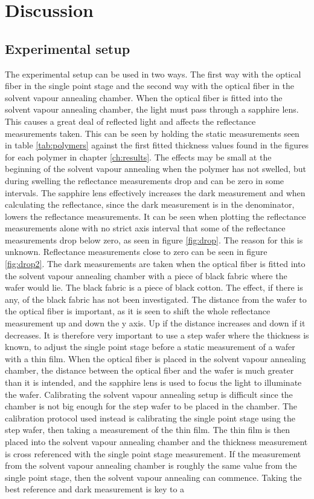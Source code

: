 \documentclass[MasterThesisMain.tex]{subfiles}
\begin{document}
\chapter{Discussion} \label{ch:discussion}

\section{Experimental setup}
The experimental setup can be used in two ways. The first way with the optical fiber in the single point stage and the second way with the optical fiber in the solvent vapour annealing chamber. When the optical fiber is fitted into the solvent vapour annealing chamber, the light must pass through a sapphire lens. This causes a great deal of reflected light and affects the reflectance measurements taken. This can be seen by holding the static measurements seen in table \ref{tab:polymers} against the first fitted thickness values found in the figures for each polymer in chapter \ref{ch:results}. The effects may be small at the beginning of the solvent vapour annealing when the polymer has not swelled, but during swelling the reflectance measurements drop and can be zero in some intervals. The sapphire lens effectively increases the dark measurement and when calculating the reflectance, since the dark measurement is in the denominator, lowers the reflectance measurements. It can be seen when plotting the reflectance measurements alone with no strict axis interval that some of the reflectance measurements drop below zero, as seen in figure \ref{fig:drop}. The reason for this is unknown. Reflectance measurements close to zero can be seen in figure \ref{fig:drop2}. The dark measurements are taken when the optical fiber is fitted into the solvent vapour annealing chamber with a piece of black fabric where the wafer would lie. The black fabric is a piece of black cotton. The effect, if there is any, of the black fabric has not been investigated. The distance from the wafer to the optical fiber is important, as it is seen to shift the whole reflectance measurement up and down the y axis. Up if the distance increases and down if it decreases. It is therefore very important to use a step wafer where the thickness is known, to adjust the single point stage before a static measurement of a wafer with a thin film. When the optical fiber is placed in the solvent vapour annealing chamber, the distance between the optical fiber and the wafer is much greater than it is intended, and the sapphire lens is used to focus the light to illuminate the wafer. Calibrating the solvent vapour annealing setup is difficult since the chamber is not big enough for the step wafer to be placed in the chamber. The calibration protocol used instead is calibrating the single point stage using the step wafer, then taking a measurement of the thin film. The thin film is then placed into the solvent vapour annealing chamber and the thickness measurement is cross referenced with the single point stage measurement. If the measurement from the solvent vapour annealing chamber is roughly the same value from the single point stage, then the solvent vapour annealing can commence. Taking the best reference and dark measurement is key to a 
\end{document}
